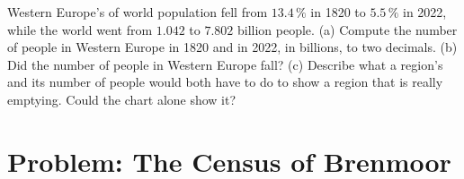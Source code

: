 \begin{exercise}[$\star\star\star$]\label{exo:g6:reading-economic-charts:12}
Western Europe's  of world population fell from $13.4\,\%$ in 1820 to
$5.5\,\%$ in 2022, while the world went from $1.042$ to $7.802$ billion
people. (a) Compute the number of people in Western Europe in 1820 and in 2022,
in billions, to two decimals. (b) Did the number of people in Western Europe
fall? (c) Describe what a region's  and its number of people would both
have to do to show a region that is really emptying. Could the  chart
alone show it?
\end{exercise}

\section{Problem: The Census of Brenmoor}

